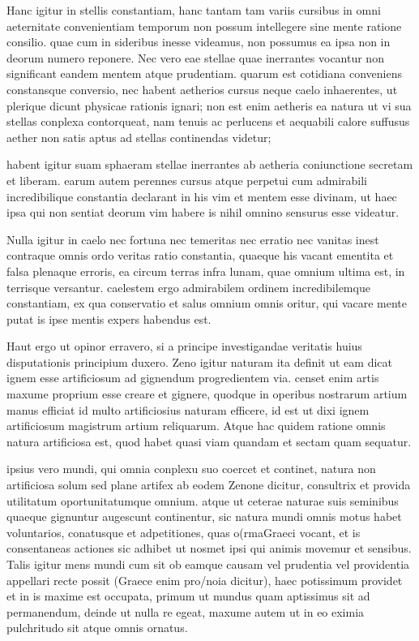  Hanc igitur in stellis constantiam, hanc tantam tam variis cursibus in omni aeternitate convenientiam temporum non possum intellegere sine mente ratione consilio. quae cum in sideribus inesse videamus, non possumus ea ipsa non in deorum numero reponere. Nec vero eae stellae quae inerrantes vocantur non significant eandem mentem atque prudentiam. quarum est cotidiana conveniens constansque conversio, nec habent aetherios cursus neque caelo inhaerentes, ut plerique dicunt physicae rationis ignari; non est enim aetheris ea natura ut vi sua stellas conplexa contorqueat, nam tenuis ac perlucens et aequabili calore suffusus aether non satis aptus ad stellas continendas videtur;

 habent igitur suam sphaeram stellae inerrantes ab aetheria coniunctione secretam et liberam. earum autem perennes cursus atque perpetui cum admirabili incredibilique constantia declarant in his vim et mentem esse divinam, ut haec ipsa qui non sentiat deorum vim habere is nihil omnino sensurus esse videatur.

 Nulla igitur in caelo nec fortuna nec temeritas nec erratio nec vanitas inest contraque omnis ordo veritas ratio constantia, quaeque his vacant ementita et falsa plenaque erroris, ea circum terras infra lunam, quae omnium ultima est, in terrisque versantur. caelestem ergo admirabilem ordinem incredibilemque constantiam, ex qua conservatio et salus omnium omnis oritur, qui vacare mente putat is ipse mentis expers habendus est.

 Haut ergo ut opinor erravero, si a principe investigandae veritatis huius disputationis principium duxero. Zeno igitur naturam ita definit ut eam dicat ignem esse artificiosum ad gignendum progredientem via. censet enim artis maxume proprium esse creare et gignere, quodque in operibus nostrarum artium manus efficiat id multo artificiosius naturam efficere, id est ut dixi ignem artificiosum magistrum artium reliquarum. Atque hac quidem ratione omnis natura artificiosa est, quod habet quasi viam quandam et sectam quam sequatur.

 ipsius vero mundi, qui omnia conplexu suo coercet et continet, natura non artificiosa solum sed plane artifex ab eodem Zenone dicitur, consultrix et provida utilitatum oportunitatumque omnium. atque ut ceterae naturae suis seminibus quaeque gignuntur augescunt continentur, sic natura mundi omnis motus habet voluntarios, conatusque et adpetitiones, quas o(rma\s Graeci vocant, et is consentaneas actiones sic adhibet ut nosmet ipsi qui animis movemur et sensibus. Talis igitur mens mundi cum sit ob eamque causam vel prudentia vel providentia appellari recte possit (Graece enim pro/noia dicitur), haec potissimum providet et in is maxime est occupata, primum ut mundus quam aptissimus sit ad permanendum, deinde ut nulla re egeat, maxume autem ut in eo eximia pulchritudo sit atque omnis ornatus.

